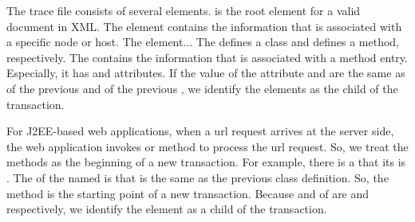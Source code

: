 The trace file consists of several elements.
 is the root element for a valid document in XML. The  element contains the information that is associated with a specific node or host. The  element...
The  defines a class and  defines a method, respectively.
The  contains the information that is associated with a method entry. Especially, it has  and  attributes. If the value of the attribute  and  are the same as  of the previous  and  of the previous , we identify the  elements as the child of the transaction.

For J2EE-based web applications, when a url request arrives at the server side, the web application invokes  or  method to process the url request.
So, we treat the methods as the beginning of a new transaction.
For example, there is a  that its  is . The  of the  named  is  that is the same as the previous class definition. So, the method is the starting point of a new transaction. Because  and  of 
 are  and  respectively, we identify the element as a child of the transaction. 
